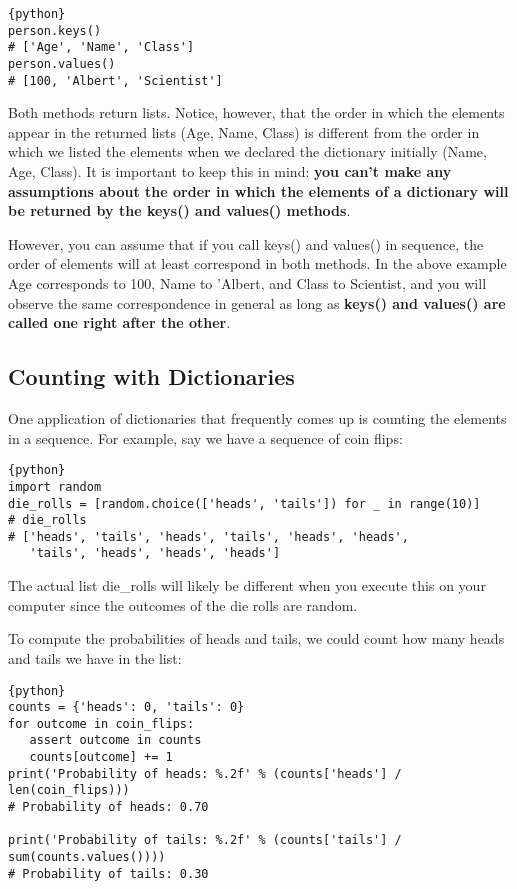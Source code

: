 \begin{lstlisting}{python}
person.keys()
# ['Age', 'Name', 'Class']
person.values()
# [100, 'Albert', 'Scientist']
\end{lstlisting}

Both methods return lists. Notice, however, that the order in which the
elements appear in the returned lists (Age, Name, Class) is different
from the order in which we listed the elements when we declared the
dictionary initially (Name, Age, Class). It is important to keep this in
mind: \textbf{you can't make any assumptions about the order in which
the elements of a dictionary will be returned by the keys() and values()
methods}.

However, you can assume that if you call keys() and values() in
sequence, the order of elements will at least correspond in both
methods. In the above example Age corresponds to 100, Name to 'Albert,
and Class to Scientist, and you will observe the same correspondence in
general as long as \textbf{keys() and values() are called one right
after the other}.

\subsection{Counting with
Dictionaries}\label{counting-with-dictionaries}

One application of dictionaries that frequently comes up is counting the
elements in a sequence. For example, say we have a sequence of coin
flips:

\begin{lstlisting}{python}
import random
die_rolls = [random.choice(['heads', 'tails']) for _ in range(10)]
# die_rolls
# ['heads', 'tails', 'heads', 'tails', 'heads', 'heads', 
   'tails', 'heads', 'heads', 'heads']
\end{lstlisting}

The actual list die\_rolls will likely be different when you execute
this on your computer since the outcomes of the die rolls are random.

To compute the probabilities of heads and tails, we could count how many
heads and tails we have in the list:

\begin{lstlisting}{python}
counts = {'heads': 0, 'tails': 0}
for outcome in coin_flips:
   assert outcome in counts
   counts[outcome] += 1
print('Probability of heads: %.2f' % (counts['heads'] / len(coin_flips)))
# Probability of heads: 0.70

print('Probability of tails: %.2f' % (counts['tails'] / sum(counts.values())))
# Probability of tails: 0.30
\end{lstlisting}

